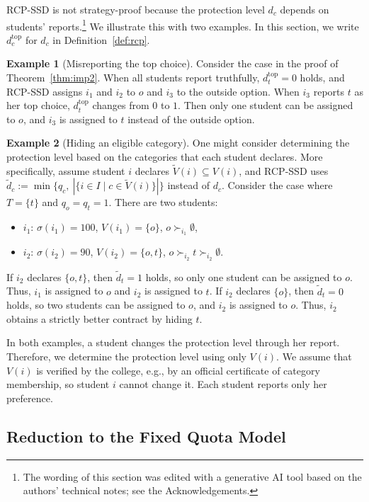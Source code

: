 \documentclass[a4paper,twoside]{article}
\theoremstyle{definition}
\newtheorem{example}{Example}
\newcommand{\dtop}{d^{\mathrm{top}}}
\newcommand{\aiedit}{\footnote{The wording of this section was edited with a generative AI tool \cite{Anthropic26a} based on the authors' technical notes; see the Acknowledgements.}}
\begin{document}
RCP-SSD is not strategy-proof because the protection level $d_c$ depends on students'
reports.\aiedit{}
We illustrate this with two examples.
In this section, we write $\dtop_c$ for $d_c$ in Definition~\ref{def:rcp}.

\begin{example}[Misreporting the top choice]
\label{ex:top}
Consider the case in the proof of Theorem~\ref{thm:imp2}.
When all students report truthfully, $\dtop_t=0$ holds, and RCP-SSD assigns $i_1$ and
$i_2$ to $o$ and $i_3$ to the outside option.
When $i_3$ reports $t$ as her top choice, $\dtop_t$ changes from $0$ to $1$.
Then only one student can be assigned to $o$, and $i_3$ is assigned to $t$ instead of
the outside option.
\end{example}

\begin{example}[Hiding an eligible category]
\label{ex:hide}
One might consider determining the protection level based on the categories that each
student declares. More specifically, assume student $i$ declares
$\tilde{V}(i)\subseteq V(i)$, and RCP-SSD uses
$\tilde{d}_c:=\min\{q_c,\ |\{i\in I\mid c\in\tilde{V}(i)\}|\}$ instead of $d_c$.
Consider the case where $T=\{t\}$ and $q_o=q_t=1$.
There are two students:
\begin{itemize}
\item $i_1$: $\sigma(i_1)=100$, $V(i_1)=\{o\}$, $o\succ_{i_1}\emptyset$,
\item $i_2$: $\sigma(i_2)=90$, $V(i_2)=\{o,t\}$,
$o\succ_{i_2}t\succ_{i_2}\emptyset$.
\end{itemize}
If $i_2$ declares $\{o,t\}$, then $\tilde{d}_t=1$ holds, so only one student can be
assigned to $o$. Thus, $i_1$ is assigned to $o$ and $i_2$ is assigned to $t$.
If $i_2$ declares $\{o\}$, then $\tilde{d}_t=0$ holds, so two students can be assigned
to $o$, and $i_2$ is assigned to $o$.
Thus, $i_2$ obtains a strictly better contract by hiding $t$.
\end{example}

In both examples, a student changes the protection level through her report.
Therefore, we determine the protection level using only $V(i)$.
We assume that $V(i)$ is verified by the college, e.g., by an official certificate of
category membership, so student $i$ cannot change it.
Each student reports only her preference.

\subsection{Reduction to the Fixed Quota Model}
\end{document}

